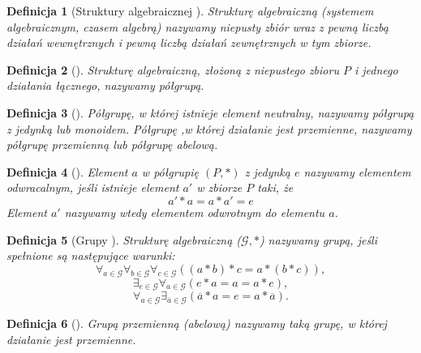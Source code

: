 \documentclass[12pt,a4paper]{report}
\newtheorem{definition}{Definicja}[chapter]
\begin{document}
\begin{definition}[Struktury algebraicznej \citep{jedrzejewski2011algebra}]
Strukturę algebraiczną (systemem algebraicznym, czasem algebrą) nazywamy niepusty zbiór wraz z pewną liczbą działań wewnętrznych i pewną liczbą działań zewnętrznych w tym zbiorze.
\end{definition}
\begin{definition}[\citep{jedrzejewski2011algebra}]
Strukturę algebraiczną, złożoną z niepustego zbioru $P$ i jednego działania łącznego, nazywamy półgrupą.
\end{definition}
\begin{definition}[\citep{jedrzejewski2011algebra}]
Półgrupę, w której istnieje element neutralny, nazywamy półgrupą z jedynką lub monoidem. Półgrupę ,w której działanie jest przemienne, nazywamy półgrupę przemienną lub półgrupę abelową. 
\end{definition}
\begin{definition}[\citep{jedrzejewski2011algebra}]
Element $a$ w półgrupię $(P,\ast)$ z jedynką $e$ nazywamy elementem odwracalnym, jeśli istnieje element $a'$ w zbiorze $P$ taki, że
\begin{equation*}
a'\ast a=a\ast a'=e
\end{equation*}
Element $a'$ nazywamy wtedy elementem odwrotnym do elementu $a$.
\end{definition}
\begin{definition}[Grupy \citep{jedrzejewski2011algebra}]
Strukturę algebraiczną ($\mathcal{G},\ast$) nazywamy grupą, jeśli spełnione są następujące warunki:
\begin{equation*}
\forall_{a\in \mathcal{G}} \forall_{b\in \mathcal{G}} \forall_{c\in \mathcal{G}} ((a\ast b)\ast c=a\ast (b\ast c)),
\end{equation*}
\begin{equation*}
\exists_{e\in \mathcal{G}} \forall_{a\in \mathcal{G}}(e\ast a=a=a\ast e),
\end{equation*}
\begin{equation*}
\forall_{a \in \mathcal{G}} \exists_{\overline{a}\in\mathcal{G}}(\overline{a}\ast a=e=a\ast \overline{a}).
\end{equation*}
\end{definition}
\begin{definition}[\citep{jedrzejewski2011algebra}]
Grupą przemienną (abelową) nazywamy taką grupę, w której działanie jest przemienne.
\end{definition}
\end{document}

